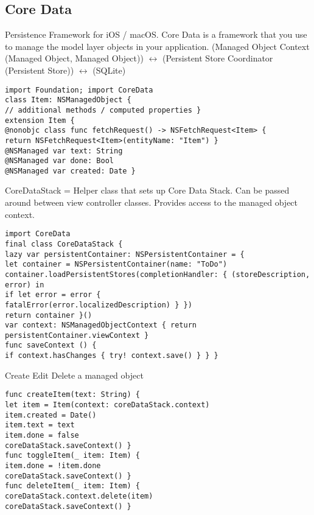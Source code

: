 \subsection{Core Data}
Persistence Framework for iOS / macOS. Core Data is a framework that you use to manage the model layer objects in your application.
(Managed Object Context (Managed Object, Managed Object)) $\leftrightarrow$ (Persistent Store Coordinator (Persistent Store)) $\leftrightarrow$ (SQLite)
\begin{lstlisting}
import Foundation; import CoreData
class Item: NSManagedObject {
// additional methods / computed properties }
extension Item {
@nonobjc class func fetchRequest() -> NSFetchRequest<Item> {
return NSFetchRequest<Item>(entityName: "Item") }
@NSManaged var text: String
@NSManaged var done: Bool
@NSManaged var created: Date }
\end{lstlisting}
CoreDataStack = Helper class that sets up Core Data Stack. Can be passed around between view controller classes. Provides access to the managed object context.
\begin{lstlisting}
import CoreData
final class CoreDataStack {
lazy var persistentContainer: NSPersistentContainer = {
let container = NSPersistentContainer(name: "ToDo")
container.loadPersistentStores(completionHandler: { (storeDescription, error) in
if let error = error {
fatalError(error.localizedDescription) } })
return container }()
var context: NSManagedObjectContext { return persistentContainer.viewContext }
func saveContext () {
if context.hasChanges { try! context.save() } } }
\end{lstlisting}
Create Edit Delete a managed object
\begin{lstlisting}
func createItem(text: String) {
let item = Item(context: coreDataStack.context)
item.created = Date()
item.text = text
item.done = false
coreDataStack.saveContext() }
func toggleItem(_ item: Item) {
item.done = !item.done
coreDataStack.saveContext() }
func deleteItem(_ item: Item) {
coreDataStack.context.delete(item)
coreDataStack.saveContext() }
\end{lstlisting}

